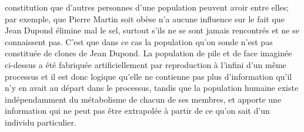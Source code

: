 constitution que d'autres personnes d'une population peuvent avoir entre 
elles; par exemple, que Pierre Martin soit ob\`ese n'a aucune 
influence sur le fait que Jean Dupond \'elimine mal le sel, surtout s'ils 
ne se sont jamais rencontr\'es et ne se connaissent pas. C'est que dans 
ce cas la population qu'on sonde n'est pas constitu\'ee de clones de Jean 
Dupond.  La population de pile et de face imagin\'ee ci-dessus a \'et\'e 
fabriqu\'ee artificiellement par reproduction \`a l'infini d'un m\^eme 
processus et il est donc logique qu'elle ne contienne pas plus 
d'information qu'il n'y en avait au d\'epart dans le processus, tandis que 
la population humaine existe ind\'ependamment du m\'etabolisme de 
chacun de ses membres, et apporte une information qui ne peut pas 
\^etre extrapol\'ee \`a partir de ce qu'on sait d'un individu particulier. 
 
 
 
 
 
\bye 
 
